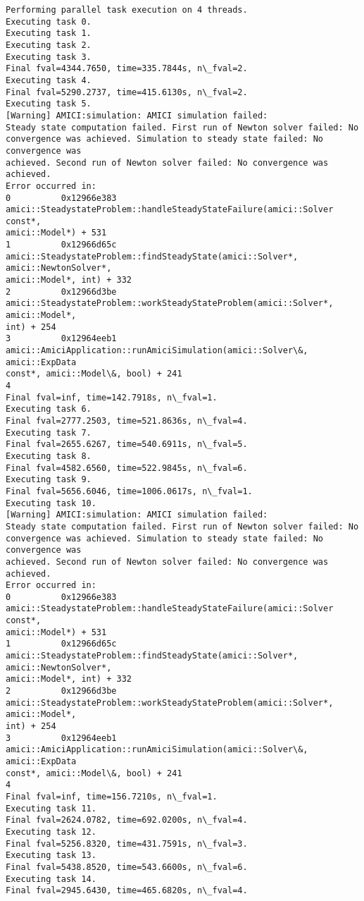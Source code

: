 \documentclass[11pt]{article}
\begin{document}
    \begin{Verbatim}[commandchars=\\\{\}]
Performing parallel task execution on 4 threads.
Executing task 0.
Executing task 1.
Executing task 2.
Executing task 3.
Final fval=4344.7650, time=335.7844s, n\_fval=2.
Executing task 4.
Final fval=5290.2737, time=415.6130s, n\_fval=2.
Executing task 5.
[Warning] AMICI:simulation: AMICI simulation failed:
Steady state computation failed. First run of Newton solver failed: No
convergence was achieved. Simulation to steady state failed: No convergence was
achieved. Second run of Newton solver failed: No convergence was achieved.
Error occurred in:
0          0x12966e383
amici::SteadystateProblem::handleSteadyStateFailure(amici::Solver const*,
amici::Model*) + 531
1          0x12966d65c
amici::SteadystateProblem::findSteadyState(amici::Solver*, amici::NewtonSolver*,
amici::Model*, int) + 332
2          0x12966d3be
amici::SteadystateProblem::workSteadyStateProblem(amici::Solver*, amici::Model*,
int) + 254
3          0x12964eeb1
amici::AmiciApplication::runAmiciSimulation(amici::Solver\&, amici::ExpData
const*, amici::Model\&, bool) + 241
4
Final fval=inf, time=142.7918s, n\_fval=1.
Executing task 6.
Final fval=2777.2503, time=521.8636s, n\_fval=4.
Executing task 7.
Final fval=2655.6267, time=540.6911s, n\_fval=5.
Executing task 8.
Final fval=4582.6560, time=522.9845s, n\_fval=6.
Executing task 9.
Final fval=5656.6046, time=1006.0617s, n\_fval=1.
Executing task 10.
[Warning] AMICI:simulation: AMICI simulation failed:
Steady state computation failed. First run of Newton solver failed: No
convergence was achieved. Simulation to steady state failed: No convergence was
achieved. Second run of Newton solver failed: No convergence was achieved.
Error occurred in:
0          0x12966e383
amici::SteadystateProblem::handleSteadyStateFailure(amici::Solver const*,
amici::Model*) + 531
1          0x12966d65c
amici::SteadystateProblem::findSteadyState(amici::Solver*, amici::NewtonSolver*,
amici::Model*, int) + 332
2          0x12966d3be
amici::SteadystateProblem::workSteadyStateProblem(amici::Solver*, amici::Model*,
int) + 254
3          0x12964eeb1
amici::AmiciApplication::runAmiciSimulation(amici::Solver\&, amici::ExpData
const*, amici::Model\&, bool) + 241
4
Final fval=inf, time=156.7210s, n\_fval=1.
Executing task 11.
Final fval=2624.0782, time=692.0200s, n\_fval=4.
Executing task 12.
Final fval=5256.8320, time=431.7591s, n\_fval=3.
Executing task 13.
Final fval=5438.8520, time=543.6600s, n\_fval=6.
Executing task 14.
Final fval=2945.6430, time=465.6820s, n\_fval=4.

\end{Verbatim}
\end{document}
